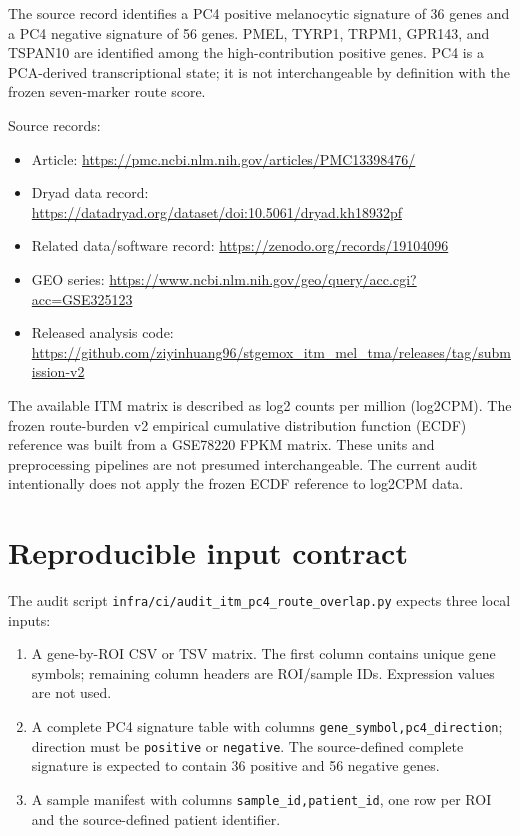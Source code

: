 \documentclass[11pt]{article}
\begin{document}
The source record identifies a PC4 positive melanocytic signature of 36 genes and a PC4 negative signature of 56 genes. PMEL, TYRP1, TRPM1, GPR143, and TSPAN10 are identified among the high-contribution positive genes. PC4 is a PCA-derived transcriptional state; it is not interchangeable by definition with the frozen seven-marker route score.

Source records:
\begin{itemize}[leftmargin=1.5em]
  \item Article: \url{https://pmc.ncbi.nlm.nih.gov/articles/PMC13398476/}
  \item Dryad data record: \url{https://datadryad.org/dataset/doi:10.5061/dryad.kh18932pf}
  \item Related data/software record: \url{https://zenodo.org/records/19104096}
  \item GEO series: \url{https://www.ncbi.nlm.nih.gov/geo/query/acc.cgi?acc=GSE325123}
  \item Released analysis code: \url{https://github.com/ziyinhuang96/stgemox_itm_mel_tma/releases/tag/submission-v2}
\end{itemize}

The available ITM matrix is described as log2 counts per million (log2CPM). The frozen route-burden v2 empirical cumulative distribution function (ECDF) reference was built from a GSE78220 FPKM matrix. These units and preprocessing pipelines are not presumed interchangeable. The current audit intentionally does not apply the frozen ECDF reference to log2CPM data.

\section{Reproducible input contract}

The audit script \texttt{infra/ci/audit\_itm\_pc4\_route\_overlap.py} expects three local inputs:

\begin{enumerate}[leftmargin=2em]
  \item A gene-by-ROI CSV or TSV matrix. The first column contains unique gene symbols; remaining column headers are ROI/sample IDs. Expression values are not used.
  \item A complete PC4 signature table with columns \texttt{gene\_symbol,pc4\_direction}; direction must be \texttt{positive} or \texttt{negative}. The source-defined complete signature is expected to contain 36 positive and 56 negative genes.
  \item A sample manifest with columns \texttt{sample\_id,patient\_id}, one row per ROI and the source-defined patient identifier.
\end{enumerate}
\end{document}
